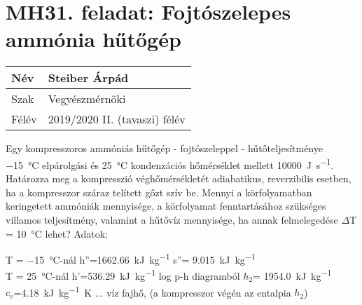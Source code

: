 

\section*{MH31. feladat: Fojtószelepes ammónia hűtőgép}


\begin{tabular}{ | p{2cm} | p{14cm} | } 
	\hline
	Név & Steiber Árpád \\ 
	\hline
	Szak & Vegyészmérnöki \\ 
	\hline
	Félév & 2019/2020 II. (tavaszi) félév \\ 
	\hline
\end{tabular}
\vspace{0.5cm}

\noindent Egy kompresszoros ammóniás hűtőgép - fojtószeleppel - hűtőteljesítménye \SI{-15}{\celsius} elpárolgási és \SI{25}{\celsius} kondenzációs hőmérséklet mellett  \SI{10000}{\joule\per\second}. Határozza meg a kompresszió véghőmérsékletét adiabatikus, reverzibilis esetben, ha a kompresszor száraz telített gőzt szív be. Mennyi a körfolyamatban keringetett ammóniák mennyisége, a körfolyamat fenntartásához szükséges villamos teljesítmény, valamint a hűtővíz mennyisége, ha annak felmelegedése $\Delta$T = \SI{10}{\celsius} lehet?
\vspace{0.5cm}
Adatok:
\begin{center}
	T = \SI{-15}{\celsius}-nál \hspace{1cm} h''=\SI{1662.66}{\kilo\joule\per\kilo\gram}  \hspace{4.2cm} s''= \SI{9.015}{\kilo\joule\per\kilo\gram} \\
\hspace{0.1cm}	T = \SI{25}{\celsius}-nál \hspace{1.5cm} h'=\SI{536,29}{\kilo\joule\per\kilo\gram} \hspace{1cm} log p-h diagramból $h_2$= \SI{1954.0}{\kilo\joule\per\kilo\gram} \\
		$c_v$=\SI{4.18}{\kilo\joule\per\kilo\gram\kelvin} ...  víz fajhő, (a kompresszor végén az entalpia $h_2$) \hspace{2.2cm}
		
\end{center}

\vspace{2mm}

